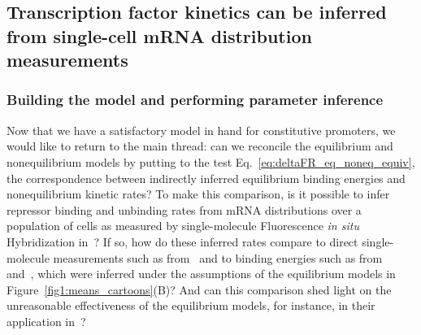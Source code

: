 \subsection{Transcription factor kinetics can be inferred from single-cell mRNA
distribution measurements}\label{sec:rep_kinetics_inference}
\subsubsection{Building the model and performing parameter inference}

Now that we have a satisfactory model in hand for constitutive promoters, we
would like to return to the main thread: can we reconcile the equilibrium and
nonequilibrium models by putting to the test
Eq.~\ref{eq:deltaFR_eq_noneq_equiv}, the correspondence between indirectly
inferred equilibrium binding energies and nonequilibrium kinetic rates? To make
this comparison, is it possible to infer repressor binding and unbinding rates
from mRNA distributions over a population of cells as measured by
single-molecule Fluorescence \textit{in situ} Hybridization in~\cite{Jones2014}?
If so, how do these inferred rates compare to direct single-molecule
measurements such as from~\cite{Hammar2014} and to binding energies such as
from~\cite{Garcia2011a} and~\cite{Razo-Mejia2018}, which were inferred under the
assumptions of the equilibrium models in Figure~\ref{fig1:means_cartoons}(B)?
And can this comparison shed light on the unreasonable effectiveness of the
equilibrium models, for instance, in their application in~\cite{Chure2019,
Chure2019a}?

